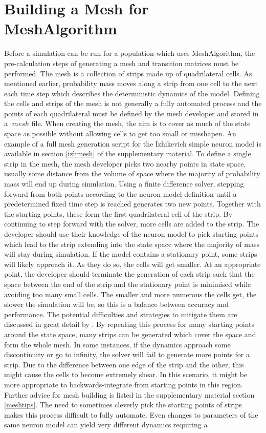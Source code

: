 \documentclass[utf8]{frontiersSCNS} %
\begin{document}
\section{Building a Mesh for MeshAlgorithm}
Before a simulation can be run for a population which uses MeshAlgorithm, the pre-calculation steps of generating a mesh and transition matrices must be performed. The mesh is a collection of strips made up of quadrilateral cells. As mentioned earlier, probability mass moves along a strip from one cell to the next each time step which describes the deterministic dynamics of the model. Defining the cells and strips of the mesh is not generally a fully automated process and the points of each quadrilateral must be defined by the mesh developer and stored in a $.mesh$ file. When creating the mesh, the aim is to cover as much of the state space as possible without allowing cells to get too small or misshapen. An example of a full mesh generation script for the Izhikevich simple neuron model \citep{izhikevich2003simple} is available in section \ref{izhmesh} of the supplementary material. To define a single strip in the mesh, the mesh developer picks two nearby points in state space, usually some distance from the volume of space where the majority of probability mass will end up during simulation. Using a finite difference solver, stepping forward from both points according to the neuron model definition until a predetermined fixed time step is reached generates two new points. Together with the starting points, these form the first quadrilateral cell of the strip. By continuing to step forward with the solver, more cells are added to the strip. The developer should use their knowledge of the neuron model to pick starting points which lead to the strip extending into the state space where the majority of mass will stay during simulation. If the model contains a stationary point, some strips will likely approach it. As they do so, the cells will get smaller. At an appropriate point, the developer should terminate the generation of each strip such that the space between the end of the strip and the stationary point is minimised while avoiding too many small cells. The smaller and more numerous the cells get, the slower the simulation will be, so this is a balance between accuracy and performance. The potential difficulties and strategies to mitigate them are discussed in great detail by \cite{de2019computational}. By repeating this process for many starting points around the state space, many strips can be generated which cover the space and form the whole mesh. In some instances, if the dynamics approach some discontinuity or go to infinity, the solver will fail to generate more points for a strip. Due to the difference between one edge of the strip and the other, this might cause the cells to become extremely shear. In this scenario, it might be more appropriate to backwards-integrate from starting points in this region. Further advice for mesh building is listed in the supplementary material section \ref{meshtips}. The need to sometimes cleverly pick the starting points of strips makes this process difficult to fully automate. Even changes to parameters of the same neuron model can yield very different dynamics requiring a 
\end{document}
